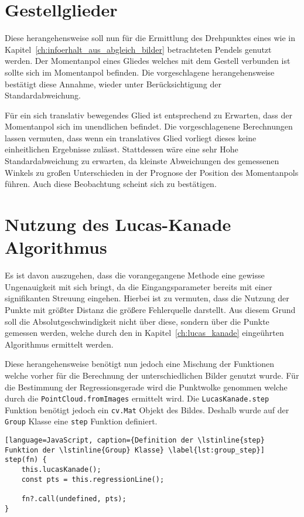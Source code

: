\section{Gestellglieder}

Diese herangehensweise soll nun für die Ermittlung des Drehpunktes eines wie in Kapitel~\ref{ch:infoerhalt_aus_abgleich_bilder} betrachteten Pendels genutzt werden.
Der Momentanpol eines Gliedes welches mit dem Gestell verbunden ist sollte sich im Momentanpol befinden.
Die vorgeschlagene herangehensweise bestätigt diese Annahme, wieder unter Berücksichtigung der Standardabweichung.

Für ein sich translativ bewegendes Glied ist entsprechend zu Erwarten, dass der Momentanpol sich im unendlichen befindet.
Die vorgeschlagenene Berechnungen lassen vermuten, dass wenn ein translatives Glied vorliegt dieses keine einheitlichen Ergebnisse zulässt.
Stattdessen wäre eine sehr Hohe Standardabweichung zu erwarten, da kleinste Abweichungen des gemessenen Winkels zu großen Unterschieden in der Prognose der Position des Momentanpols führen.
Auch diese Beobachtung scheint sich zu bestätigen.

\section{Nutzung des Lucas-Kanade Algorithmus}

Es ist davon auszugehen, dass die vorangegangene Methode eine gewisse Ungenauigkeit mit sich bringt, da die Eingangsparameter bereits mit einer signifikanten Streuung eingehen.
Hierbei ist zu vermuten, dass die Nutzung der Punkte mit größter Distanz die größere Fehlerquelle darstellt.
Aus diesem Grund soll die Absolutgeschwindigkeit nicht über diese, sondern über die Punkte gemessen werden, welche durch den in Kapitel~\ref{ch:lucas_kanade} eingeührten Algorithmus ermittelt werden.

Diese herangehensweise benötigt nun jedoch eine Mischung der Funktionen welche vorher für die Berechnung der unterschiedlichen Bilder genutzt wurde.
Für die Bestimmung der Regressionsgerade wird die Punktwolke genommen welche durch die \lstinline{PointCloud.fromImages} ermittelt wird.
Die \lstinline{LucasKanade.step} Funktion benötigt jedoch ein \lstinline{cv.Mat} Objekt des Bildes.
Deshalb wurde auf der \lstinline{Group} Klasse eine \lstinline{step} Funktion definiert.

\begin{lstlisting}[language=JavaScript, caption={Definition der \lstinline{step} Funktion der \lstinline{Group} Klasse} \label{lst:group_step}]
step(fn) {
    this.lucasKanade();
    const pts = this.regressionLine();

    fn?.call(undefined, pts);
}
\end{lstlisting}

